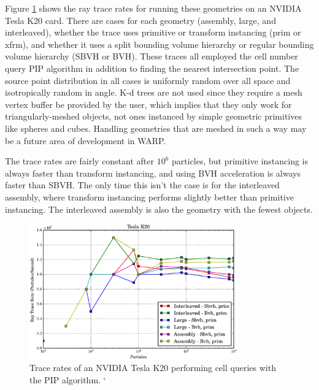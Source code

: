 Figure \ref{prelim_optix_k20} shows the ray trace rates for running these geometries on an NVIDIA Tesla K20 card.  There are cases for each geometry (assembly, large, and interleaved), whether the trace uses primitive or transform instancing (prim or xfrm), and whether it uses a split bounding volume hierarchy or regular bounding volume hierarchy (SBVH or BVH).  These traces all employed the cell number query PIP algorithm in addition to finding the nearest intersection point. %
The source point distribution in all cases is uniformly random over all space and isotropically random in angle.  %
K-d trees are not used since they require a mesh vertex buffer be provided by the user, which implies that they only work for triangularly-meshed objects, not ones instanced by simple geometric primitives like spheres and cubes.  Handling geometries that are meshed in such a way may be a future area of development in WARP.%

The trace rates are fairly constant after $10^6$ particles, but primitive instancing is always faster than transform instancing,%
 and using BVH acceleration is always faster than SBVH.  The only time this isn't the case is for the interleaved assembly, where transform instancing performs slightly better than primitive instancing.  The interleaved assembly is also the geometry with the fewest objects.  

\begin{figure}[h!] 
  \centering
    \includegraphics[width=0.8\textwidth]{graphics/prelim_optix_k20.eps}
     \caption{Trace rates of an NVIDIA Tesla K20 performing cell queries with the PIP algorithm. `\label{prelim_optix_k20} }
\end{figure}%

